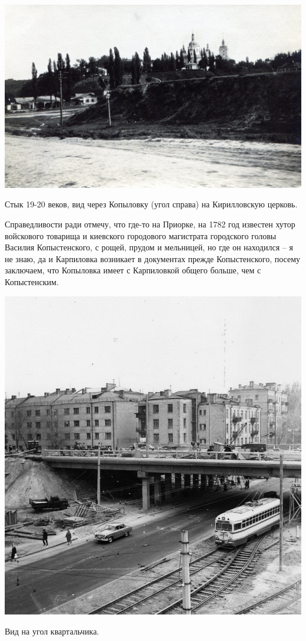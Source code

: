\begin{center}
\includegraphics[width=\linewidth]{chast-zmiy/kopyl/mid.jpg}

Стык 19-20 веков, вид через Копыловку (угол справа) на Кирилловскую церковь.
\end{center}

Справедливости ради отмечу, что где-то на Приорке, на 1782 год известен хутор войскового товарища и киевского городового магистрата городского головы Василия Копыстенского, с рощей, прудом и мельницей, но где он находился – я не знаю, да и Карпиловка возникает в документах прежде Копыстенского, посему заключаем, что Копыловка имеет с Карпиловкой общего больше, чем с Копыстенским.

\begin{center}
\includegraphics[width=\linewidth]{chast-zmiy/kopyl/1963.jpg}

Вид на угол квартальчика.
\end{center}



